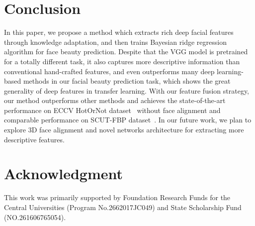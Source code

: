 \documentclass[a4paper,conference]{IEEEtran}
\begin{document}
\section{Conclusion}

  In this paper, we propose a method which extracts rich deep facial features
  through knowledge adaptation, and then trains Bayesian ridge regression
  algorithm for face beauty prediction. Despite that the VGG model is pretrained for
  a totally different task, it also captures more descriptive information than
  conventional hand-crafted features, and even outperforms many deep
  learning-based methods in our facial beauty prediction task,
  which shows the great generality of deep features in transfer learning.
  With our feature fusion strategy, our method outperforms other methods and achieves
  the state-of-the-art performance on ECCV HotOrNot dataset~\cite{gray2010predicting}
  without face alignment and comparable performance on SCUT-FBP dataset~\cite{xie2015scut}.
  In our future work, we plan to explore 3D face alignment  and
  novel networks architecture for extracting more descriptive features.





\section*{Acknowledgment}

  This work was primarily supported by Foundation Research Funds for the
  Central Universities (Program No.2662017JC049) and State Scholarship
  Fund (NO.261606765054).












\end{document}
